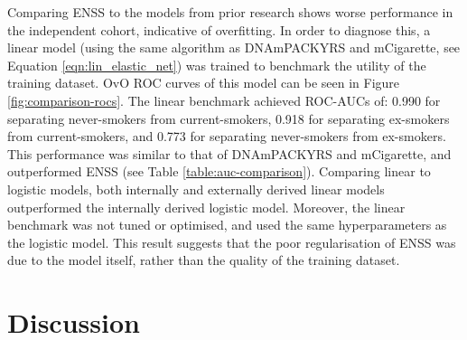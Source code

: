 \documentclass{article} %
\begin{document}
Comparing ENSS to the models from prior research shows worse performance in the independent cohort, indicative of overfitting. In order to diagnose this, a linear model (using the same algorithm as DNAmPACKYRS and mCigarette, see Equation \ref{eqn:lin_elastic_net}) was trained to benchmark the utility of the training dataset. OvO ROC curves of this model can be seen in Figure \ref{fig:comparison-rocs}. The linear benchmark achieved ROC-AUCs of: 0.990 for separating never-smokers from current-smokers, 0.918 for separating ex-smokers from current-smokers, and 0.773 for separating never-smokers from ex-smokers. This performance was similar to that of DNAmPACKYRS and mCigarette, and outperformed ENSS (see Table \ref{table:auc-comparison}). Comparing linear to logistic models, both internally and externally derived linear models outperformed the internally derived logistic model. Moreover, the linear benchmark was not tuned or optimised, and used the same hyperparameters as the logistic model. This result suggests that the poor regularisation of ENSS was due to the model itself, rather than the quality of the training dataset.

\newpage
\section{Discussion}
\end{document}
